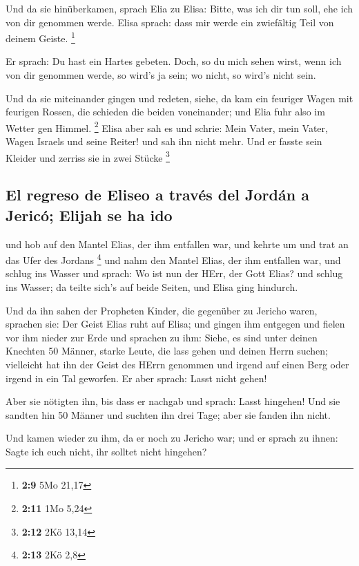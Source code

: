  Und da sie hinüberkamen, sprach Elia zu Elisa: Bitte, was
ich dir tun soll, ehe ich von dir genommen werde. Elisa sprach: dass mir
werde ein zwiefältig Teil von deinem Geiste. \footnote{\textbf{2:9} 5Mo
  21,17}

 Er sprach: Du hast ein Hartes gebeten. Doch, so du mich
sehen wirst, wenn ich von dir genommen werde, so wird's ja sein; wo
nicht, so wird's nicht sein.

 Und da sie miteinander gingen und redeten, siehe, da kam
ein feuriger Wagen mit feurigen Rossen, die schieden die beiden
voneinander; und Elia fuhr also im Wetter gen Himmel. \footnote{\textbf{2:11}
  1Mo 5,24}  Elisa aber sah es und schrie: Mein Vater,
mein Vater, Wagen Israels und seine Reiter! und sah ihn nicht mehr. Und
er fasste sein Kleider und zerriss sie in zwei Stücke \footnote{\textbf{2:12}
  2Kö 13,14}

\hypertarget{el-regreso-de-eliseo-a-travuxe9s-del-jorduxe1n-a-jericuxf3-elijah-se-ha-ido}{%
\subsection{El regreso de Eliseo a través del Jordán a Jericó; Elijah se
ha
ido}\label{el-regreso-de-eliseo-a-travuxe9s-del-jorduxe1n-a-jericuxf3-elijah-se-ha-ido}}

 und hob auf den Mantel Elias, der ihm entfallen war, und
kehrte um und trat an das Ufer des Jordans \footnote{\textbf{2:13} 2Kö
  2,8}  und nahm den Mantel Elias, der ihm entfallen war,
und schlug ins Wasser und sprach: Wo ist nun der HErr, der Gott Elias?
und schlug ins Wasser; da teilte sich's auf beide Seiten, und Elisa ging
hindurch.

 Und da ihn sahen der Propheten Kinder, die gegenüber zu
Jericho waren, sprachen sie: Der Geist Elias ruht auf Elisa; und gingen
ihm entgegen und fielen vor ihm nieder zur Erde  und
sprachen zu ihm: Siehe, es sind unter deinen Knechten 50 Männer, starke
Leute, die lass gehen und deinen Herrn suchen; vielleicht hat ihn der
Geist des HErrn genommen und irgend auf einen Berg oder irgend in ein
Tal geworfen. Er aber sprach: Lasst nicht gehen!

 Aber sie nötigten ihn, bis dass er nachgab und sprach:
Lasst hingehen! Und sie sandten hin 50 Männer und suchten ihn drei Tage;
aber sie fanden ihn nicht.

 Und kamen wieder zu ihm, da er noch zu Jericho war; und
er sprach zu ihnen: Sagte ich euch nicht, ihr solltet nicht hingehen?

